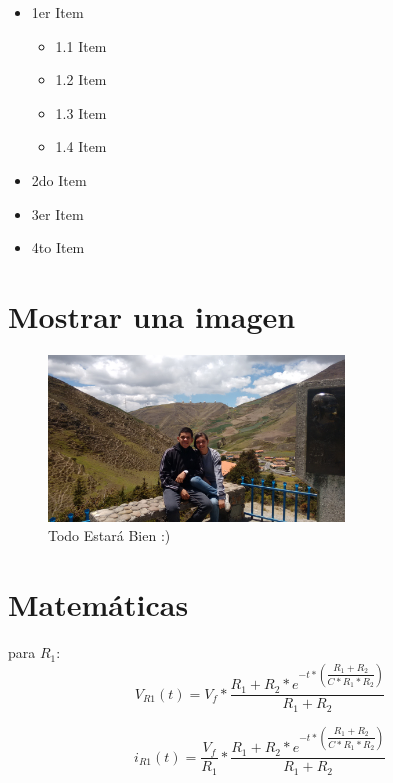 \documentclass[spanish]{article}
\begin{document}
	 \begin{itemize}
	 
		\item 1er Item 	 
			 \begin{itemize}
			 	\item 1.1 Item 	 
	 	     	\item 1.2 Item 	 
	   	     	\item 1.3 Item 	 
	 		 	\item 1.4 Item 	 
	 		 \end{itemize}
		
	 	\item 2do Item 	 
	 	\item 3er Item 	 
	 	\item 4to Item 	 
	 \end{itemize}
	 
	 
\section{Mostrar una imagen}

\begin{figure}[htb]
\centering
\includegraphics[width=0.70\textwidth]{foto.jpg}
\caption{Todo Estará Bien :)}
\label{i1}
\end{figure}	 

\break 

\section{Matemáticas}

para $R_{1}$:
\begin{equation}\label{9}
V_{R1}(t) = V_{f} * \dfrac{R_{1}+R_{2} * e^{-t*\left(  \dfrac{R_{1} + R_{2}}{C*R_{1}*R_{2}} \right) } }{R_{1} +R_{2}}
\end{equation}

\begin{equation}\label{10}
i_{R1}(t) = \dfrac{V_{f}}{R_{1}} * \dfrac{R_{1}+R_{2} * e^{-t*\left(  \dfrac{R_{1} + R_{2}}{C*R_{1}*R_{2}} \right) } }{R_{1} +R_{2}}
\end{equation}
\end{document}
